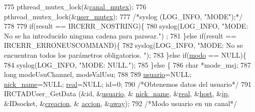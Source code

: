 \begin{DoxyCode}
{{{{{{{{{{775                         pthread\_mutex\_lock(&\hyperlink{_g-2361-06-_p1-_server_8c_ab86a544a49de18195048bac54dd3ac3e}{canal\_mutex});
776                         pthread\_mutex\_lock(&\hyperlink{_g-2361-06-_p1-_server_8c_a5dedd07a1144d2ab70b74a8e64b6a7c0}{user\_mutex});
777                         \textcolor{comment}{/*syslog (LOG\_INFO, "MODE");*/}
778 
779                         \textcolor{keywordflow}{if}(result == IRCERR\_NOSTRING)\{
780                                 syslog(LOG\_INFO, \textcolor{stringliteral}{"MODE: No se ha introducido ninguna cadena para parsear."})
      ;
781                         \}\textcolor{keywordflow}{else} \textcolor{keywordflow}{if}(result == IRCERR\_ERRONEUSCOMMAND)\{
782                                 syslog(LOG\_INFO, \textcolor{stringliteral}{"MODE: No se encuentran todos los parámetros obligatorios.
      "});
783                         \}\textcolor{keywordflow}{else} \textcolor{keywordflow}{if}(\hyperlink{_g-2361-06-_p1-_server_8c_a7451f0d59207b53af6178219fcf62677}{modo} == NULL)\{
784                                 syslog(LOG\_INFO, \textcolor{stringliteral}{"MODE: NULL."});
785                         \}\textcolor{keywordflow}{else} \{
786                                 \textcolor{keywordtype}{char} *mode\_msj; 
787                                 \textcolor{keywordtype}{long} modeUsuChannel, modeValUsu; 
788 
789                                 \hyperlink{_g-2361-06-_p1-_server_8c_a0147a5b81499984f9cb00379a8cb84af}{usuario}=NULL; \hyperlink{_g-2361-06-_p1-_server_8c_aabbf66718cda228b924a4a9441eadf62}{nick\_name}=NULL; 
      \hyperlink{_g-2361-06-_p1-_server_8c_af832f551e1c343666c3d2a55834139a0}{real}=NULL; \textcolor{keywordtype}{id}=0;
790                                 \textcolor{comment}{/*Obtenemos datos del usuario*/}
791                                 IRCTADUser\_GetData (&\textcolor{keywordtype}{id}, &\hyperlink{_g-2361-06-_p1-_server_8c_a0147a5b81499984f9cb00379a8cb84af}{usuario}, &
      \hyperlink{_g-2361-06-_p1-_server_8c_aabbf66718cda228b924a4a9441eadf62}{nick\_name}, &\hyperlink{_g-2361-06-_p1-_server_8c_af832f551e1c343666c3d2a55834139a0}{real}, &\hyperlink{_g-2361-06-_p1-_server_8c_a1c2046dcb30a629d6d9f45ff8f403f12}{host}, &\hyperlink{_g-2361-06-_p1-_server_8c_afbc356cd0e25d1dbbece7c10fd025fa6}{ip}, &IDsocket, &\hyperlink{_g-2361-06-_p1-_server_8c_a26292066ca0d17922eadee4161542ab9}{creacion}, &
      \hyperlink{_g-2361-06-_p1-_server_8c_a93e785c991445d8b8ee99c2e51242d5a}{accion}, &\hyperlink{_g-2361-06-_p1-_server_8c_adf86742e21384f58f8999d8317e6a370}{away});
792                                 \textcolor{comment}{/*Modo usuario en un canal*/}
}}}}}}}}}}
\end{DoxyCode}
